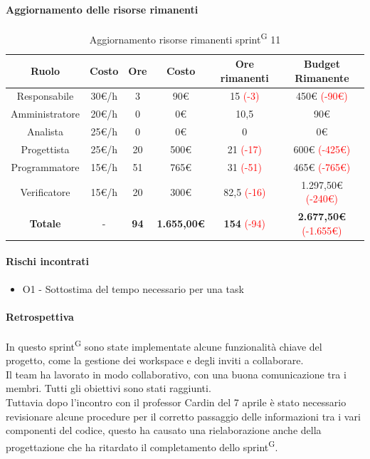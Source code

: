 \documentclass[a4paper, 11pt]{article}
\newcommand{\subsubsubsection}[1]{\paragraph{#1}}
\renewcommand{\arraystretch}{1.4} %
\begin{document}
\subsubsubsection{Aggiornamento delle risorse rimanenti}
\begin{table}[H]
	\centering
	\renewcommand{\arraystretch}{1.5}
	
	\begin{tabular}{|c|c|c|c|c|c|}
		\hline
		\textcolor{AccentColor}{\textbf{Ruolo}} &
		\textcolor{AccentColor}{\textbf{Costo}} &
		\textcolor{AccentColor}{\textbf{Ore}} &
		\textcolor{AccentColor}{\textbf{Costo}} &
		\textcolor{AccentColor}{\textbf{Ore rimanenti}} &
		\textcolor{AccentColor}{\textbf{Budget Rimanente}} \\ \hline
		
		Responsabile & 30€/h & 3 & 90€ & 15 \textcolor{red}{(-3)} & 450€ \textcolor{red}{(-90€)}\\ \hline
		
		Amministratore & 20€/h & 0 & 0€ & 10,5 & 90€ \\ \hline
		
		Analista & 25€/h & 0 & 0€ & 0 & 0€\\ \hline
		
		Progettista & 25€/h & 20 & 500€ & 21 \textcolor{red}{(-17)} & 600€ \textcolor{red}{(-425€)}\\ \hline
		
		Programmatore & 15€/h & 51 & 765€ & 31 \textcolor{red}{(-51)} & 465€ \textcolor{red}{(-765€)} \\ \hline
		
		Verificatore & 15€/h & 20 & 300€ & 82,5 \textcolor{red}{(-16)}& 1.297,50€ \textcolor{red}{(-240€)} \\ \hline
		
		\textbf{Totale} & - & \textbf{94} & \textbf{1.655,00€} & \textbf{154} \textcolor{red}{(-94)} & \textbf{2.677,50€} \textcolor{red}{(-1.655€)}\\ \hline
	\end{tabular}
	\caption{Aggiornamento risorse rimanenti sprint\textsuperscript{G} 11}
\end{table}
\subsubsubsection{Rischi incontrati}
\begin{itemize}
	\item O1 - Sottostima del tempo necessario per una task
\end{itemize}
\subsubsubsection{Retrospettiva}
In questo sprint\textsuperscript{G} sono state implementate alcune funzionalità chiave del progetto, come la gestione dei workspace e degli inviti a collaborare. \\
Il team ha lavorato in modo collaborativo, con una buona comunicazione tra i membri. Tutti gli obiettivi sono stati raggiunti. \\
Tuttavia dopo l'incontro con il professor Cardin del 7 aprile è stato necessario revisionare alcune procedure per il corretto passaggio delle informazioni tra i vari componenti del codice, questo ha causato una rielaborazione anche della progettazione che ha ritardato il completamento dello sprint\textsuperscript{G}.
\end{document}
